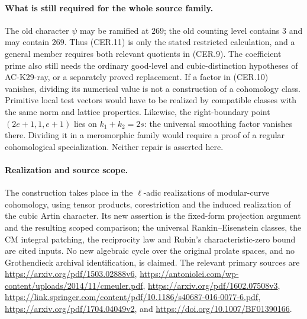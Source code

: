 \paragraph{What is still required for the whole source family.}
The old character $\psi$ may be ramified at $269$; the
old counting level contains $3$ and may contain $269$.
Thus (CER.11) is only the stated restricted calculation,
and a general member requires both relevant quotients
in (CER.9).  The coefficient prime also still needs the
ordinary good-level and cubic-distinction hypotheses of
AC-K29-ray, or a separately proved replacement.
If a factor in (CER.10) vanishes, dividing its numerical
value is not a construction of a cohomology class.
Primitive local test vectors would have to be realized by
compatible classes with the same norm and lattice properties.
Likewise, the right-boundary point $(2e+1,1,e+1)$ lies
on $k_1+k_2=2s$: the universal smoothing factor vanishes
there.  Dividing it in a meromorphic family would require
a proof of a regular cohomological specialization.
Neither repair is asserted here.

\paragraph{Realization and source scope.}
The construction takes place in the $\ell$-adic realizations
of modular-curve cohomology, using tensor products,
corestriction and the induced realization of the cubic
Artin character.  Its new assertion is the fixed-form
projection argument and the resulting scoped comparison;
the universal Rankin--Eisenstein classes, the CM integral
patching, the reciprocity law and Rubin's characteristic-zero
bound are cited inputs.  No new algebraic cycle over the
original prolate spaces, and no Grothendieck archival
identification, is claimed.
The relevant primary sources are
\url{https://arxiv.org/pdf/1503.02888v6},
\url{https://antoniolei.com/wp-content/uploads/2014/11/cmeuler.pdf},
\url{https://arxiv.org/pdf/1602.07508v3},
\url{https://link.springer.com/content/pdf/10.1186/s40687-016-0077-6.pdf},
\url{https://arxiv.org/pdf/1704.04049v2}, and
\url{https://doi.org/10.1007/BF01390166}.
